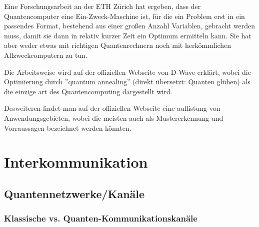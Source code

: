 
Eine Forschungsarbeit an der ETH Zürich hat ergeben, dass der Quantencomputer eine Ein-Zweck-Maschine ist, für die ein Problem erst in ein passendes Format, bestehend aus einer großen Anzahl Variablen, gebracht werden muss, damit sie dann in relativ kurzer Zeit ein Optimum ermitteln kann. Sie hat aber weder etwas mit richtigen Quantenrechnern noch mit herkömmlichen Allzweckcomputern zu tun.


Die Arbeitsweise wird auf der offiziellen Webseite von D-Wave erklärt, wobei die Optimierung durch ''quantum annealing'' (direkt übersetzt: Quanten glühen) als die einzige art des Quantencomputing dargestellt wird.


Desweiteren findet man auf der offiziellen Webseite eine auflistung von Anwendungsgebieten, wobei die meisten auch als Mustererkennung und Vorraussagen bezeichnet werden könnten.











\section{Interkommunikation}
\label{sec:interkommunikation}

\subsection{Quantennetzwerke/Kanäle}
\label{sec:Quantennetzwerke/Kanale}

\subsubsection{Klassische vs. Quanten-Kommunikationskanäle}
\label{sec:klassich_vs_quanten}

